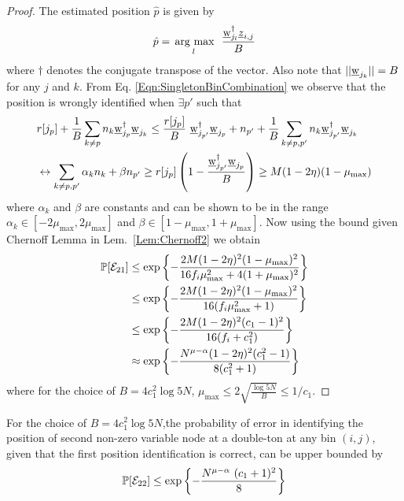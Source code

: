 \begin{proof}
	The estimated position $\hat{p}$ is given by
	\begin{align}
	\label{Eqn:SingletonBinCombination}
	\hat{p}= \underset{l}{\operatorname*{\,arg\ max}}~~ \frac{\underline{\mathrm{w}}_{j_l}^{\dagger}\underline{z}_{i,j}}{B}
	\end{align}
	where $\dagger$ denotes the conjugate transpose of the vector. Also note that $|| \underline{\mathrm{w}}_{j_k}||=B$ for any $j$ and $k$.  From Eq. \eqref{Eqn:SingletonBinCombination} we observe that the position is wrongly identified when $\exists p'$ such that
	\begin{align*}
	&r[j_p] + \frac{1}{B}\sum_{k \neq p} n_k 	\underline{\mathrm{w}}_{j_p}^{\dagger}\underline{\mathrm{w}}_{j_k} \leq \frac{r[j_p]}{B} ~ \underline{\mathrm{w}}_{j_{p'}}^{\dagger}\underline{\mathrm{w}}_{j_p}+ n_{p'}+\frac{1}{B}\sum_{k \neq p,p'}n_k\underline{\mathrm{w}}_{j_{p'}}^{\dagger} \underline{\mathrm{w}}_{j_k} \\
	&\leftrightarrow \sum_{k \neq p,p'}\alpha_k n_k+\beta n_{p'}\geq  r[j_p]\left(1-\frac{\underline{\mathrm{w}}_{j_{p'}}^{\dagger}\underline{\mathrm{w}}_{j_p}}{B}\right)\geq M(1-2\eta)(1-\mu_{\text{max}})
	\end{align*}
	where $\alpha_k$ and $\beta$ are constants and can be shown to be in the range $\alpha_k\in[-2\mu_\text{max},2\mu_\text{max}]$ and $\beta\in[1-\mu_\text{max},1+\mu_\text{max}]$. Now using the bound given Chernoff Lemma in Lem.~\ref{Lem:Chernoff2} we obtain
	\begin{align*}
	\mathbb{P}[\mathcal{E}_{21}]&\leq \exp\left\lbrace-\frac{2M(1-2\eta)^2(1-\mu_{\text{max}})^2}{16f_i\mu^2_{\max}+4(1+\mu_{\max})^2}\right\rbrace\\
	&\leq\exp\left\lbrace-\frac{2M(1-2\eta)^2(1-\mu_{\text{max}})^2}{16(f_i\mu^2_{\max}+1)}\right\rbrace\\
	&\leq\exp\left\lbrace-\frac{2M(1-2\eta)^2(c_1-1)^2}{16(f_i+c_1^2)}\right\rbrace\\
	&\approx\exp\left\lbrace-\frac{N^{\mu-\alpha}(1-2\eta)^2(c_1^2-1)}{8(c_1^2+1)}\right\rbrace\\
	\end{align*}
	where for the choice of $B=4c_1^2\log 5N$, $\mu_{\max}\leq 2\sqrt{\frac{\log 5N}{B}}\leq 1/c_1$.
	
\end{proof}
\begin{lemma}
For the choice of $B=4c_1^2\log 5N$,the probability of error in identifying the position of second non-zero variable node at a double-ton at any bin $(i,j)$, given that the first position identification is correct, can be upper bounded by
\begin{align*}
\mathbb{P}[\mathcal{E}_{22}]\leq  \exp\left\lbrace-\frac{N^{\mu - \alpha }~(c_1+1)^2}{8}\right\rbrace
\end{align*}
\end{lemma}
